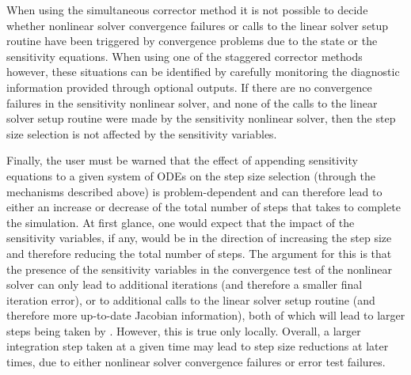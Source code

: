 When using the simultaneous corrector method it is not possible to decide whether 
nonlinear solver convergence failures or calls to the linear solver setup routine
have been triggered by convergence problems due to the state or the sensitivity 
equations.
When using one of the staggered corrector methods however, these situations can be 
identified by carefully monitoring the diagnostic information provided through 
optional outputs. If there are no convergence
failures in the sensitivity nonlinear solver, and none
of the calls to the linear solver setup routine were made by the sensitivity
nonlinear solver, then the step size selection is
not affected by the sensitivity variables.

Finally, the user must be warned that the effect of appending sensitivity 
equations to a given system of ODEs on the step size selection 
(through the mechanisms described above) is problem-dependent and can therefore
lead to either an increase or decrease of the total number of steps that {\cvodes} takes
to complete the simulation. At first glance, one would expect that the impact
of the sensitivity variables, if any, would be in the direction of increasing the
step size and therefore reducing the total number of steps. The argument for this
is that the presence of the sensitivity variables in the convergence test of the
nonlinear solver can only lead to additional iterations (and therefore a smaller
final iteration error), or to additional calls to the linear solver setup routine
(and therefore more up-to-date Jacobian information), both of which will lead
to larger steps being taken by {\cvodes}. However, this is true only locally.
Overall, a larger integration step taken at a given time may lead to 
step size reductions at later times, due to either nonlinear solver convergence
failures or error test failures.
